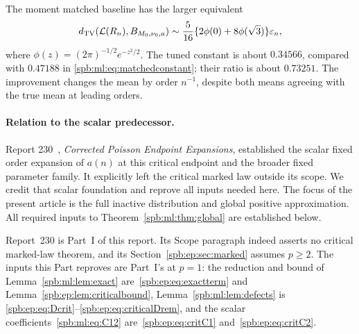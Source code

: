The moment matched baseline has the larger equivalent
\begin{equation}\label{spb:ml:eq:matchedconstant}
d_{\mathrm{TV}}(\mathcal L(R_n),B_{M_0,\nu_0,a})
\sim\frac5{16}\{2\phi(0)+8\phi(\sqrt3)\}\varepsilon_n,
\end{equation}
where $\phi(z)=(2\pi)^{-1/2}e^{-z^2/2}$. The tuned constant is about $0.34566$, compared with $0.47188$ in \eqref{spb:ml:eq:matchedconstant}; their ratio is about $0.73251$. The improvement changes the mean by order $n^{-1}$, despite both means agreeing with the true mean at leading orders.

\paragraph{Relation to the scalar predecessor.}
Report 230~\cite{report230}, \emph{Corrected Poisson Endpoint Expansions}, established the scalar fixed order expansion of $a(n)$ at this critical endpoint and the broader fixed parameter family. It explicitly left the critical marked law outside its scope. We credit that scalar foundation and reprove all inputs needed here. The focus of the present article is the full inactive distribution and global positive approximation. All required inputs to Theorem~\ref{spb:ml:thm:global} are established below.
\begin{writenote}[7 October 2026]
Report~230 is Part~I of this report. Its Scope paragraph indeed asserts no
critical marked-law theorem, and its Section~\ref{spb:ep:sec:marked} assumes
$p\ge2$. The inputs this Part reproves are Part~I's at $p=1$: the reduction
and bound of Lemma~\ref{spb:ml:lem:exact} are~\eqref{spb:ep:eq:exactterm} and
Lemma~\ref{spb:ep:lem:criticalbound}, Lemma~\ref{spb:ml:lem:defects} is
\eqref{spb:ep:eq:Dcrit}--\eqref{spb:ep:eq:criticalDrem}, and the scalar
coefficients~\eqref{spb:ml:eq:C12} are~\eqref{spb:ep:eq:critC1}
and~\eqref{spb:ep:eq:critC2}.
\end{writenote}
